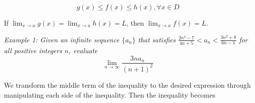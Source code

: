         \begin{equation*}
            g(x)\leq f(x)\leq h(x),\forall x\in D
        \end{equation*}

        \noindent If $\lim_{x\to a}g(x)=\lim_{x\to a}h(x)=L$, then $\lim_{x\to a}f(x)=L$. \\

        \begin{center}
        \end{center}

        \noindent \color{blue}
        \textit{Example 1: Given an infinite sequence $\{a_n\}$ that satisfies
        $\frac{2n^2-7}{4n+5}<a_n<\frac{3n^2+8}{6n-1}$ for all positive integers $n$, evaluate} \\

        \begin{equation}
            \lim_{n\to \infty}\frac{3na_n}{(n+1)^2}
        \end{equation}

        \color{black} \noindent We transform the middle term of the inequality to the desired
        expression through manipulating each side of the inequality. Then the inequality becomes \\

